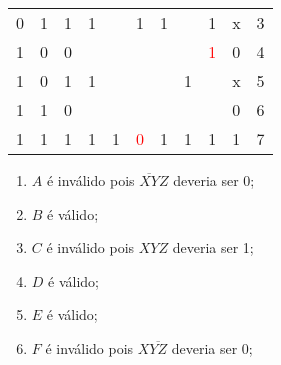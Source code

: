 \documentclass{article}
\begin{document}
\begin{resolution}
\begin{table}[H]
\begin{tabular}{ccc|cccccc|c|c}
                        0&1&1& 1 &   & 1 & 1 &   & 1 & x & 3\\
                        1&0&0&   &   &   &   &   & \textcolor{red}{1} & 0 & 4\\
                        1&0&1& 1 &   &   &   & 1 &   & x & 5\\
                        1&1&0&   &   &   &   &   &   & 0 & 6\\
                        1&1&1& 1 & 1 & \textcolor{red}{0} & 1 & 1 & 1 & 1 & 7\\\hline
                    \end{tabular}
                \end{table}\noindent
                \begin{enumerate}[noitemsep]
                    \item $A$ é inválido pois $\overline{XY}Z$ deveria ser 0;
                    \item $B$ é válido;
                    \item $C$ é inválido pois $XYZ$ deveria ser 1;
                    \item $D$ é válido;
                    \item $E$ é válido;
                    \item $F$ é inválido pois $X\overline{YZ}$ deveria ser 0;
                \end{enumerate}
            \end{resolution}
\newpage
\end{document}
